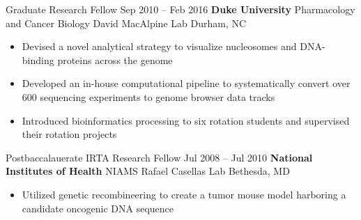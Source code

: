 
\begin{resentries}

  \resentrybeta
    {Graduate Research Fellow}
    {Sep 2010 -- Feb 2016}
    {\textbf{Duke University} \xspace \bullet \xspace \xspace Pharmacology and Cancer Biology \xspace \bullet \xspace \xspace David MacAlpine Lab} %
    {Durham, NC} %
    {
      \begin{itemize}[leftmargin=*, itemsep=-1.5mm] %
        \item{Devised a novel analytical strategy to visualize nucleosomes and DNA-binding proteins across the genome}
        \item{Developed an in-house computational pipeline to systematically convert over 600 sequencing experiments to genome browser data tracks}
        \item{Introduced bioinformatics processing to six rotation students and supervised their rotation projects}
      \end{itemize}
    }

  \resentrybeta
    {Postbaccalauerate IRTA Research Fellow}
    {Jul 2008 -- Jul 2010}
    {\textbf{National Institutes of Health} \xspace \bullet \xspace \xspace NIAMS \xspace \bullet \xspace \xspace Rafael Casellas Lab}
    {Bethesda, MD}
    {
      \begin{itemize}[leftmargin=*, itemsep=-1.5mm]
        \item{Utilized genetic recombineering to create a tumor mouse model harboring a candidate oncogenic DNA sequence}
      \end{itemize}
    }


\end{resentries}

